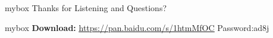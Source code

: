 \documentclass[10pt,aspectratio=43,mathserif, notes]{beamer}
\begin{document}
\section*{}
            \begin{frame}

                \begin{center}
                    \begin{minipage}{1\textwidth}
                        \begin{beamercolorbox}[wd=0.70\textwidth, rounded=true, shadow=true]{mybox}
                        \LARGE \centering Thanks for Listening
                        \LARGE \centering and
                        \LARGE \centering Questions?
                        \end{beamercolorbox}
                    \end{minipage}
                \end{center}

                \begin{center}
                    \begin{minipage}{1\textwidth}
                        \begin{beamercolorbox}[wd=0.90\textwidth, rounded=true, shadow=true]{mybox}
                        \small \textbf{Download:} \textcolor[rgb]{0.00,0.00,1.00}{\underline{\url{https://pan.baidu.com/s/1htmMfOC}}} Password:ad8j
                        \end{beamercolorbox}
                    \end{minipage}
                \end{center}


\end{frame}
\end{document}
